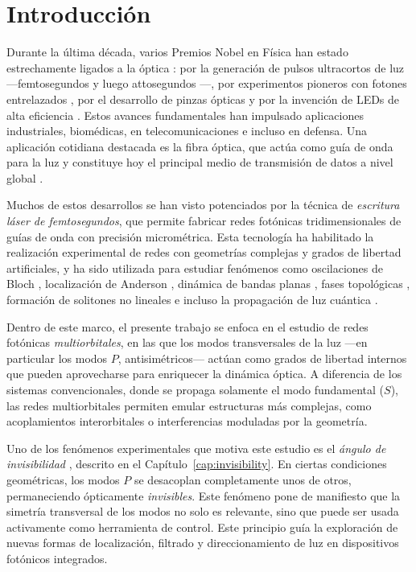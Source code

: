 \chapter{Introducción}

Durante la última década, varios Premios Nobel en Física han estado estrechamente ligados a la óptica \cite{nobel}: por la generación de pulsos ultracortos de luz —femtosegundos \cite{femto1} y luego attosegundos \cite{atto1, atto2, atto3}—, por experimentos pioneros con fotones entrelazados \cite{photons1, photons2, photons3}, por el desarrollo de pinzas ópticas \cite{opticaltweezers} y por la invención de LEDs de alta eficiencia \cite{led1, led2, led3}. Estos avances fundamentales han impulsado aplicaciones industriales, biomédicas, en telecomunicaciones e incluso en defensa. Una aplicación cotidiana destacada es la fibra óptica, que actúa como guía de onda para la luz y constituye hoy el principal medio de transmisión de datos a nivel global \cite{fibra2, fibra}.

Muchos de estos desarrollos se han visto potenciados por la técnica de \textit{escritura láser de femtosegundos}, que permite fabricar redes fotónicas tridimensionales de guías de onda con precisión micrométrica. Esta tecnología ha habilitado la realización experimental de redes con geometrías complejas y grados de libertad artificiales, y ha sido utilizada para estudiar fenómenos como oscilaciones de Bloch \cite{BlochOsci}, localización de Anderson \cite{Anderson}, dinámica de bandas planas \cite{lieb1, lieb2, artificialFB, FBdynamics}, fases topológicas \cite{obstopo, obsfloquet, topo1dphoto, toporusos}, formación de solitones no lineales \cite{discretesolitons} e incluso la propagación de luz cuántica \cite{qed, squeezed, topoquantum}.

Dentro de este marco, el presente trabajo se enfoca en el estudio de redes fotónicas \textit{multiorbitales}, en las que los modos transversales de la luz —en particular los modos \( P \), antisimétricos— actúan como grados de libertad internos que pueden aprovecharse para enriquecer la dinámica óptica. A diferencia de los sistemas convencionales, donde se propaga solamente el modo fundamental (\( S \)), las redes multiorbitales permiten emular estructuras más complejas, como acoplamientos interorbitales o interferencias moduladas por la geometría.

Uno de los fenómenos experimentales que motiva este estudio es el \textit{ángulo de invisibilidad} \cite{Pmodecoupling}, descrito en el Capítulo~\ref{cap:invisibility}. En ciertas condiciones geométricas, los modos \( P \) se desacoplan completamente unos de otros, permaneciendo ópticamente \textit{invisibles}. Este fenómeno pone de manifiesto que la simetría transversal de los modos no solo es relevante, sino que puede ser usada activamente como herramienta de control. Este principio guía la exploración de nuevas formas de localización, filtrado y direccionamiento de luz en dispositivos fotónicos integrados.

